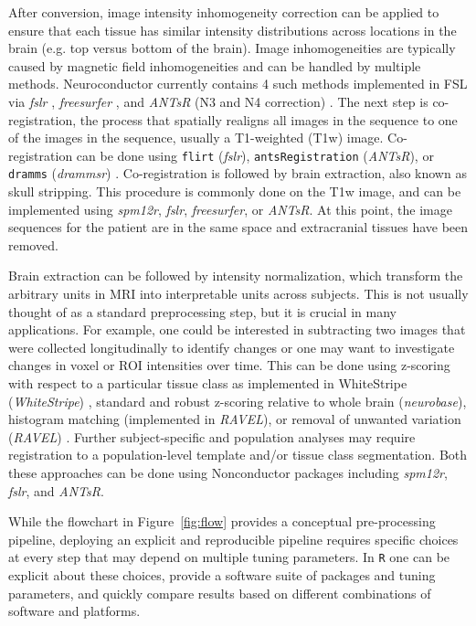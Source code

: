 \documentclass[]{elsarticle} %
\newcommand{\code}[1]{\texttt{#1}}
\newcommand{\pkg}[1]{\emph{#1}}
\newcommand{\rlang}{\texttt{R}}
\begin{document}
After conversion, image intensity inhomogeneity correction can be applied to ensure that each tissue has similar intensity distributions across locations in the brain (e.g. top versus bottom of the brain). Image inhomogeneities are typically caused by magnetic field inhomogeneities and can be handled by multiple methods. Neuroconductor currently contains 4 such methods implemented in FSL via \pkg{fslr} \cite{zhang_segmentation_2001},  \pkg{freesurfer} \cite{sled_nonparametric_1998}, and \pkg{ANTsR} (N3 and N4 correction) \cite{sled_nonparametric_1998,tustison_n4itk:_2010}.  The next step is co-registration, the process that spatially realigns all images in the sequence to one of the images in the sequence, usually a T1-weighted (T1w) image.  Co-registration can be done using \code{flirt} (\pkg{fslr}), \code{antsRegistration} (\pkg{ANTsR}), or \code{dramms} (\pkg{drammsr}) \cite{dramms}. Co-registration is followed by brain extraction, also known as skull stripping.  This procedure is commonly done on the T1w image, and can be implemented using \pkg{spm12r}, \pkg{fslr}, \pkg{freesurfer}, or \pkg{ANTsR}. At this point, the image sequences for the patient are in the same space and extracranial tissues have been removed.

Brain extraction can be followed by intensity normalization,  which transform the arbitrary units in MRI into interpretable units across subjects. This is not usually thought of as a standard preprocessing step, but it is crucial in many applications. For example, one could be interested in subtracting two images that were collected longitudinally to identify changes or one may want to investigate changes in voxel or ROI intensities over time.  This can be done using z-scoring with respect to a particular tissue class as implemented in WhiteStripe (\pkg{WhiteStripe}) \citep{whitestripe}, standard and robust z-scoring relative to whole brain (\pkg{neurobase}), histogram matching (implemented in \pkg{RAVEL}), or removal of unwanted variation (\pkg{RAVEL}) \citep{ravel}.  Further subject-specific and population analyses may require registration to a population-level template and/or tissue class segmentation. Both these approaches can be done using Nonconductor packages including \pkg{spm12r}, \pkg{fslr}, and \pkg{ANTsR}.

While the flowchart in Figure~\ref{fig:flow} provides a conceptual pre-processing pipeline, deploying an explicit and reproducible pipeline requires specific choices at every step that may depend on multiple tuning parameters. In {\rlang} one can be explicit about these choices, provide a software suite of packages and tuning parameters, and quickly compare results based on different combinations of software and platforms.  
\end{document}
